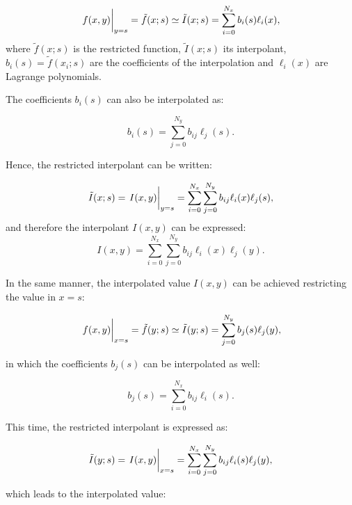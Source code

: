      \begin{equation}
     \eval{f(x,y)}_{y=s} = \tilde{f}(x;s)  \simeq \tilde{I}(x;s) = \sum_{i=0}^{N_x} b_i(s) \ell_i(x),
     \end{equation}
     where $\tilde{f}(x;s)$ is the restricted function, $\tilde{I}(x;s)$ its interpolant, $b_i(s) = \tilde{f}(x_i;s)$ are the coefficients of the interpolation and $\ell_i(x)$ are Lagrange polynomials. 
     
     The coefficients $b_i(s)$ can also be interpolated as:
     
     \begin{equation}
     b_i(s) = \sum_{j=0}^{N_y} b_{ij} \ell_j(s) .
     \end{equation}
     
     Hence, the restricted interpolant can be written:
     
     \begin{equation}
     \tilde{I}(x;s) = \eval{I(x,y)}_{y=s} =\sum_{i=0}^{N_x} \sum_{j=0}^{N_y} b_{ij} \ell_i(x) \ell_j(s) ,
     \end{equation}
     and therefore the interpolant $I(x,y)$ can be expressed:
     \begin{equation}
     {I}(x,y) = \sum_{i=0}^{N_x} \sum_{j=0}^{N_y} b_{ij} \ell_i(x) \ell_j(y) .
     \end{equation}
     
     In the same manner, the interpolated value $I(x,y)$ can be achieved restricting the value in $x=s$:
     
     \begin{equation}
     \eval{f(x,y)}_{x=s} = \tilde{f}(y;s)  \simeq \tilde{I}(y;s) = \sum_{j=0}^{N_y} b_j(s) \ell_j(y),
     \end{equation}
     
     in which the coefficients $b_j(s)$ can be interpolated as well:
     
     \begin{equation}
     b_j(s) = \sum_{i=0}^{N_x} b_{ij} \ell_i(s) .
     \end{equation}
     
     This time, the restricted interpolant is expressed as:
     
     \begin{equation}
     \tilde{I}(y;s) = \eval{I(x,y)}_{x=s} =\sum_{i=0}^{N_x} \sum_{j=0}^{N_y} b_{ij} \ell_i(s) \ell_j(y) ,
     \end{equation}
     
     which leads to the interpolated value:
     
